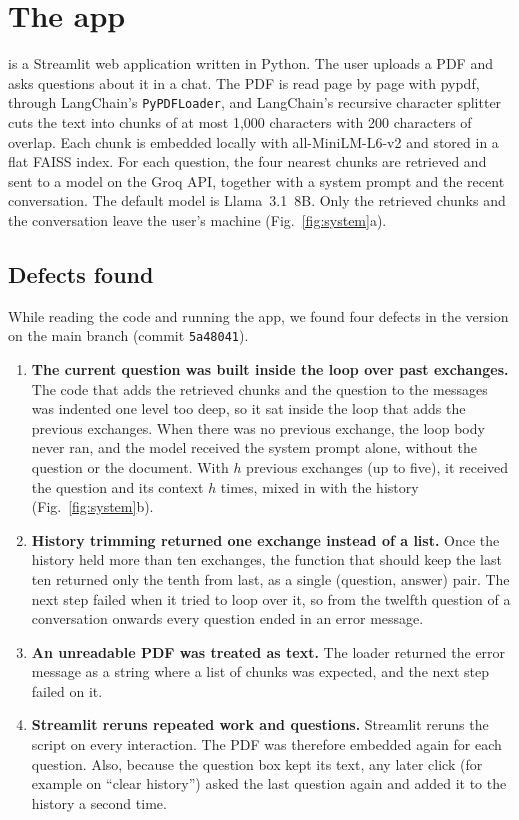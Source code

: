 \section{The app}
\label{sec:app}

\App{} is a Streamlit web application written in Python. The user uploads a PDF and asks
questions about it in a chat. The PDF is read page by page with pypdf, through LangChain's
\texttt{PyPDFLoader}, and LangChain's recursive character splitter cuts the text into chunks of at
most 1,000 characters with 200 characters of overlap. Each chunk is embedded locally with
all-MiniLM-L6-v2 and stored in a flat FAISS index. For each question, the four nearest chunks are
retrieved and sent to a model on the Groq API, together with a system prompt and the recent
conversation. The default model is Llama~3.1~8B. Only the retrieved chunks and the conversation
leave the user's machine (Fig.~\ref{fig:system}a).



\subsection{Defects found}
\label{sec:defects}

While reading the code and running the app, we found four defects in the version on the main
branch (commit \texttt{5a48041}).

\begin{enumerate}
  \item \textbf{The current question was built inside the loop over past exchanges.} The code
  that adds the retrieved chunks and the question to the messages was indented one level too
  deep, so it sat inside the loop that adds the previous exchanges. When there was no previous
  exchange, the loop body never ran, and the model received the system prompt alone, without
  the question or the document. With $h$ previous exchanges (up to five), it received the
  question and its context $h$ times, mixed in with the history (Fig.~\ref{fig:system}b).
  \item \textbf{History trimming returned one exchange instead of a list.} Once the history held
  more than ten exchanges, the function that should keep the last ten returned only the tenth
  from last, as a single (question, answer) pair. The next step failed when it tried to loop
  over it, so from the twelfth question of a conversation onwards every question ended in an
  error message.
  \item \textbf{An unreadable PDF was treated as text.} The loader returned the error message as
  a string where a list of chunks was expected, and the next step failed on it.
  \item \textbf{Streamlit reruns repeated work and questions.} Streamlit reruns the script on
  every interaction. The PDF was therefore embedded again for each question. Also, because the
  question box kept its text, any later click (for example on ``clear history'') asked the last
  question again and added it to the history a second time.
\end{enumerate}

